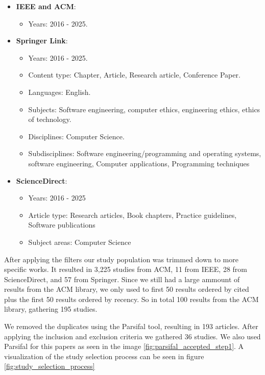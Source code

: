 \begin{itemize}
  \item \textbf{IEEE and ACM}: 
  \begin{itemize}
    \item Years: 2016 - 2025.
  \end{itemize}

  \item \textbf{Springer Link}:  
  \begin{itemize}
    \item Years: 2016 - 2025.
    \item Content type: Chapter, Article, Research article, Conference Paper.
    \item Languages: English.
    \item Subjects: Software engineering, computer ethics, engineering ethics, ethics of technology.
    \item Disciplines: Computer Science.
    \item Subdisciplines: Software engineering/programming and operating systems, software engineering, Computer applications, Programming techniques
  \end{itemize}

  \item \textbf{ScienceDirect}:  
  \begin{itemize}
    \item Years: 2016 - 2025
    \item Article type: Research articles, Book chapters, Practice guidelines, Software publications
    \item Subject areas: Computer Science
  \end{itemize}
\end{itemize}

After applying the filters our study population was trimmed down to more specific works. It resulted in 3,225 studies from ACM, 11 from IEEE, 28 from ScienceDirect, and 57 from Springer.
Since we still had a large ammount of results from the ACM library, we only used to first 50 results ordered by cited plus the first 50 results ordered by recency. So in total 100 results from
the ACM library, gathering 195 studies.

We removed the duplicates using the Parsifal tool, resulting in 193 articles. After applying the inclusion and exclusion criteria we gathered 36 studies. We also used Parsifal for this papers as 
seen in the image \ref{fig:parsifal_accepted_step1}.
A visualization of the study selection process can be seen in figure \ref{fig:study_selection_process}

